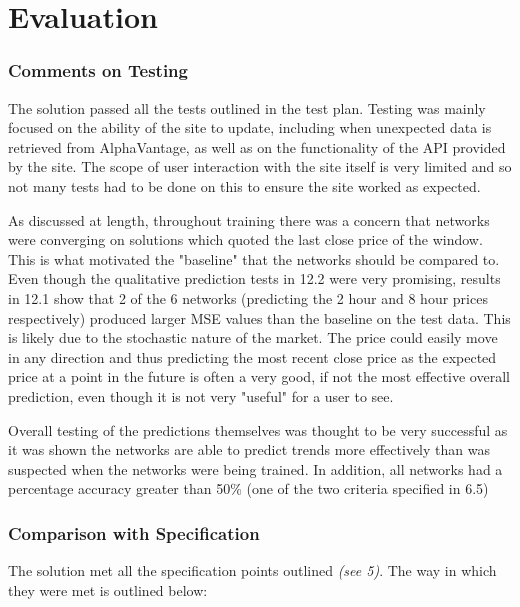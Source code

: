 \newpage
\part{Evaluation}  

    \section{Comments on Testing}
    The solution passed all the tests outlined in the test plan. Testing was mainly focused on the ability of the site to update, including when unexpected data is retrieved from AlphaVantage, as well as on the functionality of the API provided by the site. The scope of user interaction with the site itself is very limited and so not many tests had to be done on this to ensure the site worked as expected.

    As discussed at length, throughout training there was a concern that networks were converging on solutions which quoted the last close price of the window. This is what motivated the "baseline" that the networks should be compared to. Even though the qualitative prediction tests in 12.2 were very promising, results in 12.1 show that 2 of the 6 networks (predicting the 2 hour and 8 hour prices respectively) produced larger MSE values than the baseline on the test data. This is likely due to the stochastic nature of the market. The price could easily move in any direction and thus predicting the most recent close price as the expected price at a point in the future is often a very good, if not the most effective overall prediction, even though it is not very "useful" for a user to see.

    Overall testing of the predictions themselves was thought to be very successful as it was shown the networks are able to predict trends more effectively than was suspected when the networks were being trained. In addition, all networks had a percentage accuracy greater than 50\% (one of the two criteria specified in 6.5)

    \section{Comparison with Specification}
    The solution met all the specification points outlined \textit{(see 5)}. The way in which they were met is outlined below:

